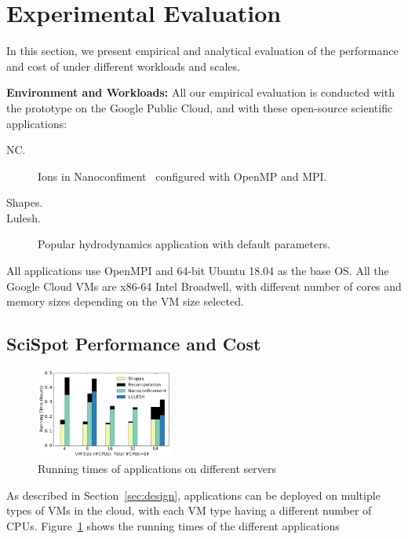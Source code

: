 \section{Experimental Evaluation}

In this section, we present empirical and analytical evaluation of the performance and cost of \sysname under different workloads and scales. 

\noindent \textbf{Environment and Workloads:} All our empirical evaluation is conducted with the \sysname prototype on the Google Public Cloud, and with these open-source scientific applications:
\begin{description}
\item[NC.] Ions in Nanoconfiment~\cite{} configured with OpenMP and MPI. 
\item[Shapes.] 
\item[Lulesh.] Popular hydrodynamics application with default parameters. 
\end{description}

All applications use OpenMPI and 64-bit Ubuntu 18.04 as the base OS.
All the Google Cloud VMs are x86-64 Intel Broadwell, with different number of cores and memory sizes depending on the VM size selected. 



\subsection{SciSpot Performance and Cost}

\begin{figure}
  \centering
  \includegraphics[width=0.4\textwidth]{../graphs/runtime-bars.pdf}
  \caption{Running times of applications on different servers}
  \label{fig:runtimes-bar}
\end{figure}

As described in Section~\ref{sec:design}, applications can be deployed on multiple types of VMs in the cloud, with each VM type having a different number of CPUs. 
Figure~\ref{fig:runtimes-bar} shows the running times of the different applications 

